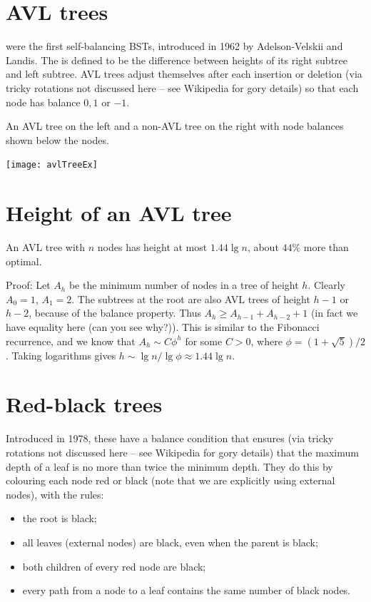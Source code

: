 \section{AVL trees}
 were the first self-balancing BSTs, introduced in 1962 by Adelson-Velskii and Landis. 
The  is defined to be the difference between heights of its 
right subtree and left subtree. 
AVL trees adjust themselves after each insertion or deletion (via tricky rotations not discussed here -- see Wikipedia for gory details) 
so that each node has balance $0, 1$ or $-1$.

\begin{Boxample} \label{ex:avlTreeEx}
An AVL tree on the left and a non-AVL tree on the right with node balances shown below the nodes.
\begin{center}
  \texttt{[image: avlTreeEx]}
\end{center}
\end{Boxample}

\section{Height of an AVL tree}
\begin{Boxample}
An AVL tree with $n$ nodes has height at most $1.44 \lg n$, about $44\%$ more 
than optimal.

Proof: Let $A_h$ be the minimum number of nodes in a tree of height $h$. 
Clearly $A_0 = 1$, $A_1 = 2$. 
The subtrees at the root are also AVL trees of height $h-1$ or $h-2$, because of the balance property. 
Thus $A_h \geq A_{h-1} + A_{h-2} + 1$ (in fact we have equality here (can you see why?)). 
This is similar to the Fibonacci recurrence, and we know that 
$A_h \sim C \phi^h$ for some $C>0$, where $\phi = (1+\sqrt{5})/2$. 
Taking logarithms gives $h \sim \lg n / \lg \phi \approx 1.44 \lg n$. 
\end{Boxample}

\section{Red-black trees}
Introduced in 1978, these have a balance condition that ensures (via tricky rotations not discussed here -- see Wikipedia for gory details) 
that the maximum depth of a leaf is no more than twice the minimum depth. 
They do this by colouring each node red or black (note that we are explicitly using external nodes), with the rules:
\begin{itemize}
\item the root is black;
\item all leaves (external nodes) are black, even when the parent is black;
\item both children of every red node are black;
\item every path from a node to a leaf contains the same number of black nodes.
\end{itemize}


